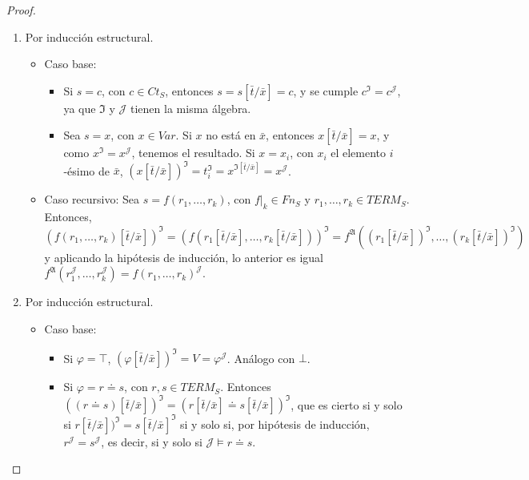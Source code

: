 \begin{proof}\mbox{}
\begin{enumerate} 
    \item Por inducción estructural.
        \begin{itemize}
            \item Caso base:
                \begin{itemize}
                    \item Si $s = c$, con $c \in Ct_S$, entonces $s=s[\bar{t}/\bar{x}]=c$, y se cumple $c^{\mathfrak{I}}=c^{\mathcal{J}}$, ya que $\mathfrak{I}$ y $\mathcal{J}$ tienen la misma álgebra.
                    \item Sea $s = x$, con $x \in Var$. Si $x$ no está en $\bar{x}$, entonces $x[\bar{t}/\bar{x}]=x$, y como $x^{\mathfrak{I}}=x^{\mathcal{J}}$, tenemos el resultado. Si $x = x_i$, con $x_i$ el elemento $i$-ésimo de $\bar{x}$, $(x[\bar{t}/\bar{x}])^{\mathfrak{I}} = t_i^{\mathfrak{I}} = x^{\mathfrak{I}[\bar{t}/\bar{x}]} = x^{\mathcal{J}}$.
                \end{itemize}
            \item Caso recursivo: Sea $s = f(r_1, \dots, r_k)$, con $f|_k \in Fn_S$ y $r_1, \dots, r_k \in TERM_S$. Entonces, $(f(r_1, \dots, r_k)[\bar{t}/\bar{x}])^{\mathfrak{I}} = (f(r_1[\bar{t}/\bar{x}], \dots, r_k[\bar{t}/\bar{x}]))^{\mathfrak{I}} = f^{\mathfrak{A}}((r_1[\bar{t}/\bar{x}])^{\mathfrak{I}}, \dots, (r_k[\bar{t}/\bar{x}])^{\mathfrak{I}})$ y aplicando la hipótesis de inducción, lo anterior es igual $f^{\mathfrak{A}}(r_1^{\mathcal{J}}, \dots, r_k^{\mathcal{J}}) = f(r_1, \dots, r_k)^{\mathcal{J}}.$
        \end{itemize}
    \item Por inducción estructural.
        \begin{itemize}
            \item Caso base:
                \begin{itemize}
                    \item Si $\varphi = \top$, $(\varphi[\bar{t}/\bar{x}])^{\mathfrak{I}} = V = \varphi^{\mathcal{J}}$. Análogo con $\bot$.
                    \item Si $\varphi = r \doteq s$, con $r, s \in TERM_S$. Entonces $((r \doteq s)[\bar{t}/\bar{x}])^{\mathfrak{I}} = (r[\bar{t}/\bar{x}] \doteq s[\bar{t}/\bar{x}])^{\mathfrak{I}}$, que es cierto si y solo si $r[\bar{t}/\bar{x}])^{\mathfrak{I}} = s[\bar{t}/\bar{x}]^{\mathfrak{I}}$ si y solo si, por hipótesis de inducción, $r^{\mathcal{J}} = s^{\mathcal{J}}$, es decir, si y solo si $\mathcal{J} \vDash r \doteq s$.

\end{itemize}
\end{itemize}
\end{enumerate}
\end{proof}
